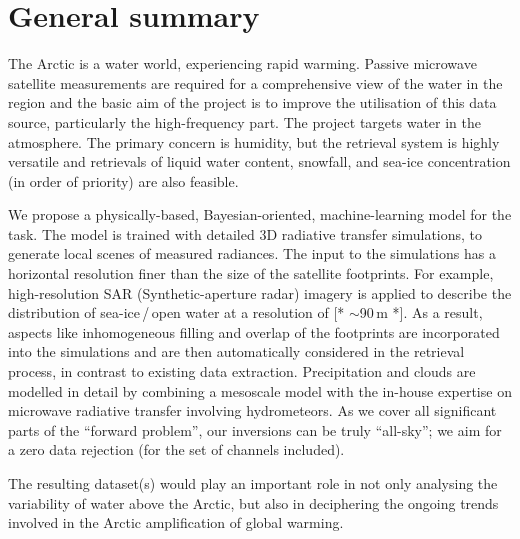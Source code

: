 \documentclass[12pt,oneside,a4paper]{article}
\newcommand\intodo[1]{{\color{red} [* #1 *]}}
\begin{document}
	
	
	\thispagestyle{empty}
	\vspace*{-10mm}
	\noindent
	\textbf{\Large \LongTitle}




\section{General summary}
%
The Arctic is a water world, experiencing rapid warming. Passive microwave
satellite measurements are required for a comprehensive view of the water in
the region and the basic aim of the project is to improve the utilisation of
this data source, particularly the high-frequency part. The project targets
water in the atmosphere. The primary concern is humidity, but the retrieval
system is highly versatile and retrievals of liquid water content,
snowfall, and sea-ice concentration (in order of priority) are also feasible.

We propose a physically-based, Bayesian-oriented, machine-learning model for
the task. The model is trained with detailed 3D radiative transfer simulations,
to generate local scenes of measured radiances. The input to the simulations
has a horizontal resolution finer than the size of the satellite footprints.
For example, high-resolution SAR (Synthetic-aperture radar) imagery is applied to describe the
distribution of sea-ice\,/\,open water at a resolution of \intodo{$\sim$90\,m}. As a result,
aspects like inhomogeneous filling and overlap of the footprints are
incorporated into the simulations and are then automatically considered in the
retrieval process, in contrast to existing data extraction. Precipitation and
clouds are modelled in detail by combining a mesoscale model with the in-house
expertise on microwave radiative transfer involving hydrometeors. As we cover
all significant parts of the ``forward problem'', our inversions can be truly
``all-sky''; we aim for a zero data rejection (for the set of channels
included).

The resulting dataset(s) would play an important role in not only analysing the
variability of water above the Arctic, but also in deciphering the
ongoing trends involved in the Arctic amplification of global warming.
\end{document}
